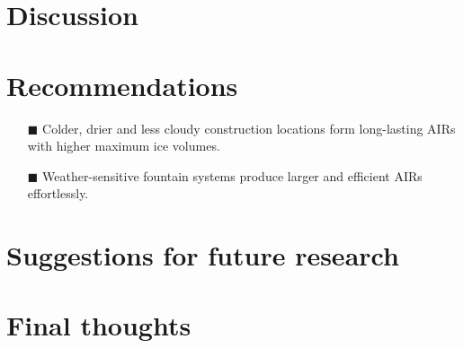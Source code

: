 \section{Discussion}

\section{Recommendations}

\begin{itemize} 

\item[\tiny{$\blacksquare$}] Colder, drier and less cloudy construction locations form long-lasting AIRs with
  higher maximum ice volumes. 

\item[\tiny{$\blacksquare$}] Weather-sensitive fountain systems produce larger and efficient AIRs effortlessly. 

\end{itemize}

\section{Suggestions for future research}

\section{Final thoughts}
